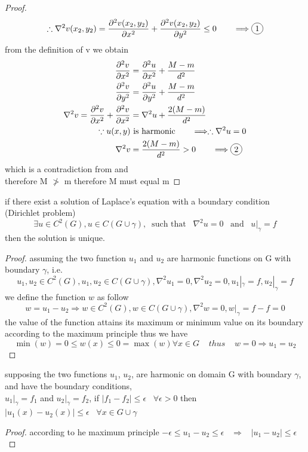 \documentclass[]{article}
\begin{document}
\begin{proof}
\[    \]
    \[
        \therefore  \nabla^2 v(x_2,y_2) =  \frac{\partial^2 v(x_2,y_2)}{\partial x^2}+\frac{\partial^2 v(x_2,y_2)}{\partial y^2} \leq 0 \dquad \Longrightarrow \circled{1}
    \]
    from the definition of v we obtain
    \begin{align*}
        \frac{\partial^2 v}{\partial x^2} &= \frac{\partial^2 u}{\partial x^2} + \frac{M-m}{d^2}
        \\
        \frac{\partial^2 v}{\partial y^2} &= \frac{\partial^2 u}{\partial y^2} + \frac{M-m}{d^2}
        \\
        \nabla^2 v = \frac{\partial^2 v}{\partial x^2} + \frac{\partial^2 v}{\partial x^2} &= \nabla^2 u + \frac{2(M-m)}{d^2}
        \\
        \because u(x,y) &\text{ is harmonic}\dquad \Longrightarrow \therefore \nabla^2 u = 0
        \\
        \nabla^2 v &= \frac{2(M-m)}{d^2} > 0 \dquad \Longrightarrow \circled{2}
    \end{align*}
    which is a contradiction from  and  
    \\
    therefore M $\ngtr$ m therefore M must equal m 
\end{proof}
\begin{theorem}
    if there exist a solution of Laplace's equation 
    with a boundary condition (Dirichlet problem)
    \[
    \exists u \in C^2(G), u \in C(G \cup \gamma),\;\; \text{such that} \;\;\; \nabla^2 u =0 \;\;\; \text{and} \;\;\; u|_\gamma = f
    \]
    then the solution is unique.
\end{theorem}
\begin{proof}
assuming the two function $u_1$ and $u_2$ are harmonic functions on G with boundary $\gamma$, i.e. 
\[
    u_1 ,u_2 \in C^2(G), u_1 , u_2 \in C(G \cup \gamma), \nabla^2 u_1 =0, \nabla^2 u_2 =0, u_1|_\gamma = f, u_2|_\gamma = f    
\]
we define the function $w$ as follow
\[
    w = u_1-u_2 \Rightarrow w\in C^2(G), w \in C(G \cup \gamma), \nabla^2 w =0, w|_\gamma = f-f = 0    
\]
the value of the function attains its maximum or minimum value on its boundary according to the maximum principle thus we have
\[
    \min(w) = 0 \leq w(x) \leq 0= \max(w) \forall x \in G \;\;\;\; thus \;\;\;\; w = 0 \Rightarrow u_1 = u_2     
\]
\end{proof}

\begin{theorem}
    supposing the two functions $u_1$, $u_2$, are harmonic on domain G with boundary $\gamma$, and have the boundary conditions, 
    \\
    $u_1|_\gamma = f_1$ and $u_2|_\gamma = f_2$, if $|f_1 - f_2| \leq \epsilon  \;\;\; \forall \epsilon > 0$ then $|u_1(x) - u_2(x)| \leq \epsilon \;\;\; \forall x \in G \cup \gamma $
\end{theorem}
\begin{proof}
    according to he maximum principle $-\epsilon \leq u_1 - u_2 \leq \epsilon \;\;\; \Rightarrow \;\;\; |u_1 - u_2| \leq \epsilon$
\end{proof}
\end{document}
